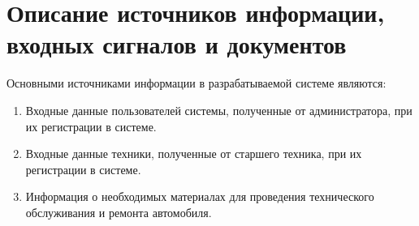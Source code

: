 \documentclass[../nirs.tex]{subfiles}
\begin{document}
\section{Описание источников информации, входных сигналов и документов}
Основными источниками информации в разрабатываемой системе являются:
\begin{enumerate}
	\item Входные данные пользователей системы, полученные от администратора,
		при их регистрации в системе.
    \item Входные данные техники, полученные от старшего техника, при их
		регистрации в системе.
	\item Информация о необходимых материалах для проведения технического
        обслуживания и ремонта автомобиля.
\end{enumerate}
\end{document}
